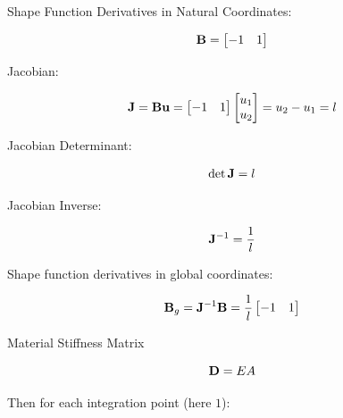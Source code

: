 Shape Function Derivatives in Natural Coordinates:

\begin{equation}
    \mathbf{B} = \begin{bmatrix}
        -1 & 1 \\
    \end{bmatrix}
\end{equation}

Jacobian:

\begin{equation}
    \mathbf{J} = \mathbf{B} \mathbf{u} = \begin{bmatrix}
        -1 & 1 \\
    \end{bmatrix}
    \begin{bmatrix}
        u_1 \\
        u_2 \\
    \end{bmatrix}
    = u_2 - u_1 = l
\end{equation}

Jacobian Determinant:

\begin{equation}
    \det \mathbf{J} = l
\end{equation}

Jacobian Inverse:

\begin{equation}
    \mathbf{J}^{-1} = \frac{1}{l}
\end{equation}

Shape function derivatives in global coordinates:

\begin{equation}
    \mathbf{B}_g = \mathbf{J}^{-1} \mathbf{B} = \frac{1}{l}
    \begin{bmatrix}
        -1 & 1 \\
    \end{bmatrix}
\end{equation}

Material Stiffness Matrix

\begin{equation}
    \mathbf{D} = EA
\end{equation}

Then for each integration point (here $1$):


